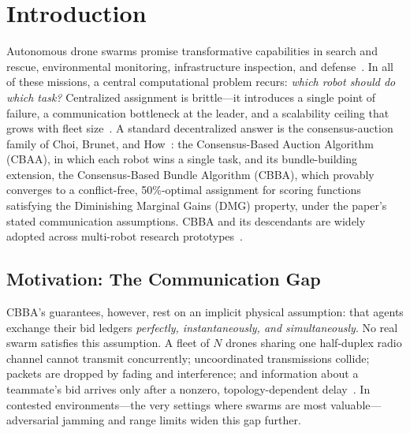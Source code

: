 \section{Introduction}\label{sec:intro}

Autonomous drone swarms promise transformative capabilities in search and rescue, environmental monitoring, infrastructure inspection, and defense~\cite{chung2018survey,bravo2023swarm}.
In all of these missions, a central computational problem recurs: \emph{which robot should do which task?}
Centralized assignment is brittle---it introduces a single point of failure, a communication bottleneck at the leader, and a scalability ceiling that grows with fleet size~\cite{gerkey2004formal,korsah2015comprehensive}.
A standard decentralized answer is the consensus-auction family of Choi, Brunet, and How~\cite{choi2009}: the Consensus-Based Auction Algorithm (CBAA), in which each robot wins a single task, and its bundle-building extension, the Consensus-Based Bundle Algorithm (CBBA), which provably converges to a conflict-free, 50\%-optimal assignment for scoring functions satisfying the Diminishing Marginal Gains (DMG) property, under the paper's stated communication assumptions.
CBBA and its descendants are widely adopted across multi-robot research prototypes~\cite{nestinger2018cbbaSurvey,verma2021cbbaApplications}.

\subsection{Motivation: The Communication Gap}
CBBA's guarantees, however, rest on an implicit physical assumption: that agents exchange their bid ledgers \emph{perfectly, instantaneously, and simultaneously}.
No real swarm satisfies this assumption.
A fleet of $N$ drones sharing one half-duplex radio channel cannot transmit concurrently; uncoordinated transmissions collide; packets are dropped by fading and interference; and information about a teammate's bid arrives only after a nonzero, topology-dependent delay~\cite{tardioli2019grounding,mott2020communication}.
In contested environments---the very settings where swarms are most valuable---adversarial jamming and range limits widen this gap further.

